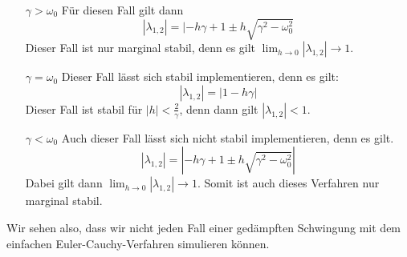 \documentclass[12pt,a4paper]{article}
\begin{document}
\begin{enumerate}
	\item[$\gamma > \omega_0$] Für diesen Fall gilt dann
		\begin{equation*}
			|\lambda_{1,2}| = |-h\gamma + 1 \pm h\sqrt{\gamma^2-\omega_0^2}
		\end{equation*}
		Dieser Fall ist nur marginal stabil, denn es gilt $\lim_{h \to 0} |\lambda_{1,2}| \rightarrow 1$.
	\item[$\gamma = \omega_0$] Dieser Fall lässt sich stabil implementieren, denn es gilt:
	\begin{equation*}
		|\lambda_{1,2}| = | 1 - h\gamma|
	\end{equation*}
	Dieser Fall ist stabil für $|h| < \frac{2}{\gamma}$, denn dann gilt $|\lambda_{1,2}| < 1$.
	\item[$\gamma < \omega_0$] Auch dieser Fall lässt sich nicht stabil implementieren, denn es gilt.
	\begin{equation*}
		|\lambda_{1,2}| = |-h\gamma + 1 \pm h\sqrt{\gamma^2 - \omega_0^2}|
	\end{equation*}
	Dabei gilt dann $\lim_{h \to 0} |\lambda_{1,2}| \rightarrow 1$. Somit ist auch dieses Verfahren nur marginal stabil.
\end{enumerate}
Wir sehen also, dass wir nicht jeden Fall einer gedämpften Schwingung mit dem einfachen Euler-Cauchy-Verfahren simulieren können.
\end{document}
